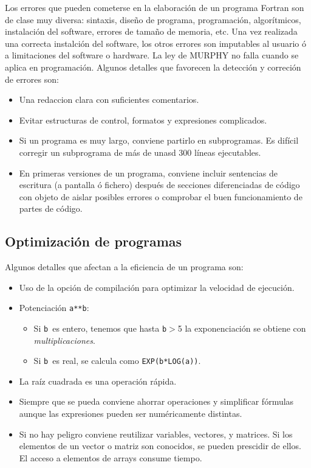 Los errores que pueden cometerse en la elaboración de un programa Fortran son de clase muy diversa: sintaxis, diseño de programa, programación, algorítmicos, instalación del software, errores de tamaño de memoria, etc. Una vez realizada una correcta instalción del software, los otros errores son imputables al usuario ó a limitaciones del software o hardware. La ley de MURPHY no falla cuando se aplica en programación. Algunos detalles que favorecen la detección y correción de errores son:

\begin{itemize}
	\item Una redaccion clara con suficientes comentarios.
	\item Evitar estructuras de control, formatos y expresiones complicados.
	\item Si un programa es muy largo, conviene partirlo en subprogramas. Es difícil corregir un subprograma de más de unasd 300 líneas ejecutables.
	\item En primeras versiones de un programa, conviene incluir sentencias de escritura (a pantalla ó fichero) después de secciones diferenciadas de código con objeto de aislar posibles errores o comprobar el buen funcionamiento de partes de código.
\end{itemize}
 

\subsection{Optimización de programas}

Algunos detalles que afectan a la eficiencia de un programa son:

\begin{itemize}
	\item Uso de la opción de compilación para optimizar la velocidad de ejecución.
	\item Potenciación {\tt a**b}:
	      \begin{itemize}
		      \item Si {\tt b }es entero, tenemos que hasta {\tt b}$>$5 la exponenciación se obtiene con {\it multiplicaciones}.
		      \item Si {\tt b }es real, se calcula como {\tt EXP(b*LOG(a))}.
	      \end{itemize}
	\item La raíz cuadrada es una operación rápida.
	\item Siempre que se pueda conviene ahorrar operaciones y simplificar fórmulas aunque las expresiones pueden ser numéricamente distintas.
	\item Si no hay peligro conviene reutilizar variables, vectores, y matrices. Si los elementos de un vector o matriz son conocidos, se pueden prescidir de ellos. El acceso a elementos de arrays consume tiempo.
\end{itemize}